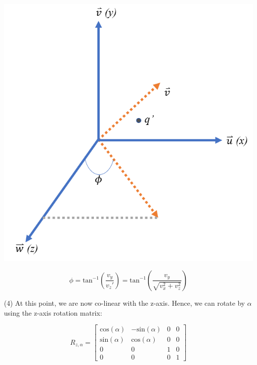 \documentclass[12pt,letterpaper]{article}
\begin{document}
\includegraphics[scale=0.75]{rot4}


\begin{equation}
    \phi = \text{tan}^{-1}(\frac{v_y}{v_z'}) = \text{tan}^{-1}(\frac{v_y}{\sqrt{v_x^2+v_z^2}})
\end{equation}

(4) At this point, we are now co-linear with the z-axis. Hence, we can rotate by $\alpha$ using the z-axis rotation matrix:

\begin{equation}
    R_{z, \alpha} = \begin{bmatrix}
        \text{cos}(\alpha) & -\text{sin}(\alpha) & 0 & 0 \\
        \text{sin}(\alpha) &  \text{cos}(\alpha) & 0 & 0 \\
        0 & 0 & 1 & 0 \\
        0 & 0 & 0 & 1
    \end{bmatrix}
\end{equation}
\end{document}
